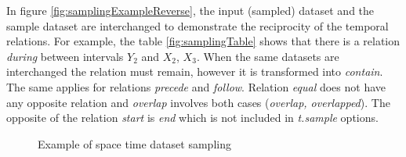 \documentclass[a4paper,12pt]{article}
\newcommand{\mod}[1]{\textsl{#1}}
\begin{document}
In figure \ref{fig:samplingExampleReverse}, the input (sampled) dataset and the sample dataset are interchanged
to demonstrate the reciprocity of the temporal relations. For example, the table \ref{fig:samplingTable} shows that
there is a relation \emph{during} between intervals $Y_2$ and $X_2$, $X_3$.
When the same datasets are interchanged the relation must remain, however it is transformed into \emph{contain}.
The same applies for relations \emph{precede} and \emph{follow}.
Relation \emph{equal} does not have any opposite relation and \emph{overlap} involves both cases (\emph{overlap, overlapped}).
The opposite of the relation \emph{start} is \emph{end} which is not included in \mod{t.sample} options.



\begin{figure}[ht]
\centering
{}
\caption{Example of space time dataset sampling }
\label{fig:samplingExample}
\end{figure}
\end{document}

